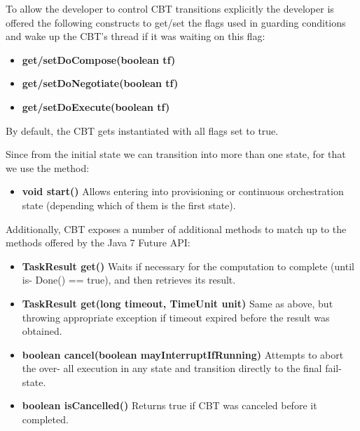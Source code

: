 To allow the developer to control CBT transitions explicitly the developer is offered the following constructs to get/set the flags used in guarding conditions and wake up the CBT’s thread if it was waiting on this flag:
\begin{itemize}
\item {\bf get/setDoCompose(boolean tf)}
\item {\bf get/setDoNegotiate(boolean tf)}
\item {\bf get/setDoExecute(boolean tf)}
\end{itemize}
By default, the CBT gets instantiated with all flags set to true. 

Since from the initial state we can transition into more than one state, for that we use
the method:
\begin{itemize}
\item {\bf void start()} Allows entering into provisioning or continuous orchestration state (depending which of them is the first state). 
\end{itemize}

Additionally, CBT exposes a number of additional methods to match up to the methods offered by the Java 7 Future API:
\begin{itemize}
\item {\bf TaskResult get()} Waits if necessary for the computation to complete (until is- Done() == true), and then retrieves its result. 
\item {\bf TaskResult get(long timeout, TimeUnit unit)} Same as above, but throwing appropriate exception if timeout expired before the result was obtained.
\item {\bf boolean cancel(boolean mayInterruptIfRunning)} Attempts to abort the over- all execution in any state and transition directly to the final fail-state. %
\item {\bf boolean isCancelled()} Returns true if CBT was canceled before it completed. %
\end{itemize}


